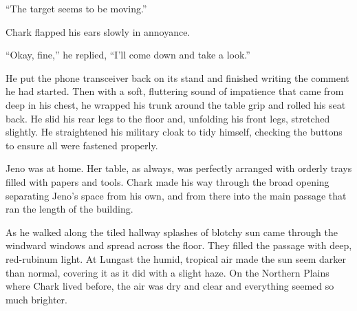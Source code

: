 ``The target seems to be moving.''

Chark flapped his ears slowly in annoyance.

``Okay, fine,'' he replied, ``I'll come down and take a look.''

He put the phone transceiver back on its stand and finished writing the comment he had started.
Then with a soft, fluttering sound of impatience that came from deep in his chest, he wrapped
his trunk around the table grip and rolled his seat back. He slid his rear legs to the floor
and, unfolding his front legs, stretched slightly. He straightened his military cloak to tidy
himself, checking the buttons to ensure all were fastened properly.

Jeno was at home. Her table, as always, was perfectly arranged with orderly trays filled with
papers and tools. Chark made his way through the broad opening separating Jeno's space from his
own, and from there into the main passage that ran the length of the building.

As he walked along the tiled hallway splashes of blotchy sun came through the windward windows
and spread across the floor. They filled the passage with deep, red-rubinum light. At Lungast
the humid, tropical air made the sun seem darker than normal, covering it as it did with a
slight haze. On the Northern Plains where Chark lived before, the air was dry and clear and
everything seemed so much brighter.

